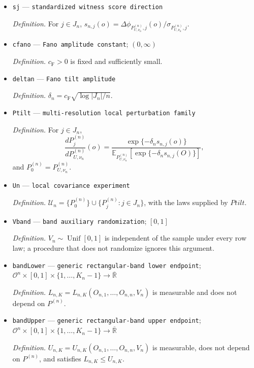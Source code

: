 \documentclass{article}
\begin{document}
\begin{itemize}
  \item \texttt{sj} --- \texttt{standardized witness score direction}
  \par\smallskip\noindent\emph{Definition.} For \(j\in J_n\), \(s_{n,j}(o)=\Delta\phi_{P_{U,\nu_n}^{(n)},j}(o)/\sigma_{P_{U,\nu_n}^{(n)},j}\).
  \item \texttt{cfano} --- \texttt{Fano amplitude constant}; \((0,\infty)\)
  \par\smallskip\noindent\emph{Definition.} \(c_{\mathrm F}>0\) is fixed and sufficiently small.
  \item \texttt{deltan} --- \texttt{Fano tilt amplitude}
  \par\smallskip\noindent\emph{Definition.} \(\delta_n=c_{\mathrm F}\sqrt{\log|J_n|/n}\).
  \item \texttt{Ptilt} --- \texttt{multi-\allowbreak{}resolution local perturbation family}
  \par\smallskip\noindent\emph{Definition.} For \(j\in J_n\),
\[
 \frac{dP_j^{(n)}}{dP_{U,\nu_n}^{(n)}}(o)
 =\frac{\exp\{-\delta_n s_{n,j}(o)\}}
 {\mathbb E_{P_{U,\nu_n}^{(n)}}[\exp\{-\delta_n s_{n,j}(O)\}]},
\]
and \(P_0^{(n)}=P_{U,\nu_n}^{(n)}\).
  \item \texttt{Un} --- \texttt{local covariance experiment}
  \par\smallskip\noindent\emph{Definition.} \(\mathcal U_n=\{P_0^{(n)}\}\cup\{P_j^{(n)}:j\in J_n\}\), with the laws supplied by \(Ptilt\).
  \item \texttt{Vband} --- \texttt{band auxiliary randomization}; \([0,1]\)
  \par\smallskip\noindent\emph{Definition.} \(V_n\sim\operatorname{Unif}[0,1]\) is independent of the sample under every row law; a procedure that does not randomize ignores this argument.
  \item \texttt{bandLower} --- \texttt{generic rectangular-\allowbreak{}band lower endpoint}; \(\mathcal O^n\times[0,1]\times\{1,\ldots,K_n-1\}\to\overline{\mathbb R}\)
  \par\smallskip\noindent\emph{Definition.} \(L_{n,K}=L_{n,K}(O_{n,1},\ldots,O_{n,n},V_n)\) is measurable and does not depend on \(P^{(n)}\).
  \item \texttt{bandUpper} --- \texttt{generic rectangular-\allowbreak{}band upper endpoint}; \(\mathcal O^n\times[0,1]\times\{1,\ldots,K_n-1\}\to\overline{\mathbb R}\)
  \par\smallskip\noindent\emph{Definition.} \(U_{n,K}=U_{n,K}(O_{n,1},\ldots,O_{n,n},V_n)\) is measurable, does not depend on \(P^{(n)}\), and satisfies \(L_{n,K}\le U_{n,K}\).

\end{itemize}
\end{document}
